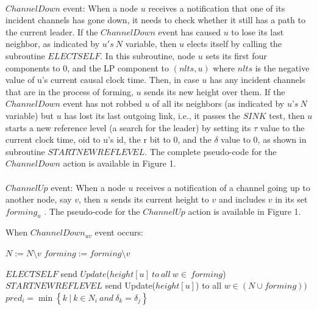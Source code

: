 \paragraph{}$ChannelDown$ event: When a node $u$ receives a notification that one of its incident channels has gone down, it needs to check whether it still has a path to the current leader. If the $ChannelDown$ event has caused $u$ to lose its last neighbor, as indicated by $u's~N$ variable, then $u$ elects itself by calling the subroutine $ELECTSELF$. In this subroutine, node $u$ sets its first four components to 0, and the LP component to $(nlts,u)$ where $nlts$ is the negative value of u’s current causal clock time. Then, in case $u$ has any incident channels that are in the process of forming, $u$ sends its new height over them. If the $ChannelDown$ event has not robbed $u$ of all its neighbors (as indicated by $u’s~N$ variable) but $u$ has lost its last outgoing link, i.e., it passes the $SINK$ test, then $u$ starts a new reference level (a search for the leader) by setting its $\tau$ value to the current clock time, oid to u’s id, the r bit to 0, and the $\delta$ value to $0$, as shown in subroutine $STARTNEWREFLEVEL$. The complete pseudo-code for the $ChannelDown$ action is available in Figure 1.

\paragraph{}$ChannelUp$ event: When a node $u$ receives a notification of a channel going up to another node, say $v$, then $u$ sends its current height to $v$ and includes $v$ in its set $forming_u$ . The pseudo-code for the $ChannelUp$ action is available in Figure 1.

\begin{algorithm}
	\caption{When $ChannelDown_{uv}$ event occurs:}
	\begin{algorithmic}[1]
		
		\State $N := N \setminus {v}$
		\State $forming := forming \setminus {v}$
		
		\State $ELECTSELF$
		\State send $Update$($height[u]~to~all~w\in ~forming$)
		\State $STARTNEWREFLEVEL$
		\State send Update($height[u]$) to all $w \in (N \cup forming))$
		\State $pred_i = \min \left\lbrace  k~|~k \in N_i~and~\delta _k = \delta _j \right\rbrace  $
		\EndIf
		
		
	\end{algorithmic}

\end{algorithm}

